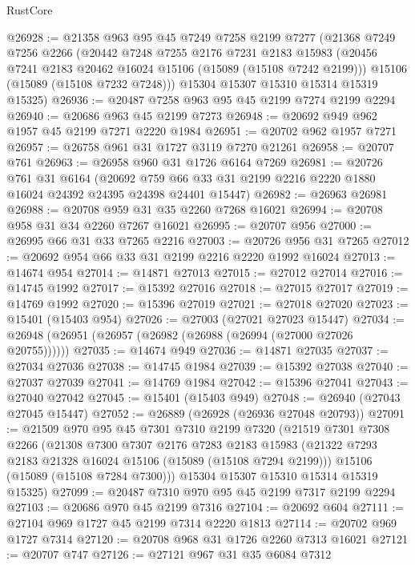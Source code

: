 \begin{lexlean}{RustCore}
\begin{coremodule}
@26928 := @21358
    @963
    @95
    @45
    @7249
    @7258
    @2199
    @7277
    (@21368
      @7249
      @7256
      @2266
      (@20442
        @7248
        @7255
        @2176
        @7231
        @2183
        @15983
        (@20456 @7241 @2183 @20462 @16024 @15106 (@15089 (@15108 @7242 @2199)))
        @15106
        (@15089 (@15108 @7232 @7248)))
      @15304
      @15307
      @15310
      @15314
      @15319
      @15325)
@26936 := @20487 @7258 @963 @95 @45 @2199 @7274 @2199 @2294
@26940 := @20686 @963 @45 @2199 @7273
@26948 := @20692 @949 @962 @1957 @45 @2199 @7271 @2220 @1984
@26951 := @20702 @962 @1957 @7271
@26957 := @26758 @961 @31 @1727 @3119 @7270 @21261
@26958 := @20707 @761
@26963 := @26958 @960 @31 @1726 @6164 @7269
@26981 := @20726
    @761
    @31
    @6164
    (@20692 @759 @66 @33 @31 @2199 @2216 @2220 @1880 @16024 @24392 @24395 @24398 @24401 @15447)
@26982 := @26963 @26981
@26988 := @20708 @959 @31 @35 @2260 @7268 @16021
@26994 := @20708 @958 @31 @34 @2260 @7267 @16021
@26995 := @20707 @956
@27000 := @26995 @66 @31 @33 @7265 @2216
@27003 := @20726 @956 @31 @7265
@27012 := @20692 @954 @66 @33 @31 @2199 @2216 @2220 @1992 @16024
@27013 := @14674 @954
@27014 := @14871 @27013
@27015 := @27012 @27014
@27016 := @14745 @1992
@27017 := @15392 @27016
@27018 := @27015 @27017
@27019 := @14769 @1992
@27020 := @15396 @27019
@27021 := @27018 @27020
@27023 := @15401 (@15403 @954)
@27026 := @27003 (@27021 @27023 @15447)
@27034 := @26948 (@26951 (@26957 (@26982 (@26988 (@26994 (@27000 @27026 @20755))))))
@27035 := @14674 @949
@27036 := @14871 @27035
@27037 := @27034 @27036
@27038 := @14745 @1984
@27039 := @15392 @27038
@27040 := @27037 @27039
@27041 := @14769 @1984
@27042 := @15396 @27041
@27043 := @27040 @27042
@27045 := @15401 (@15403 @949)
@27048 := @26940 (@27043 @27045 @15447)
@27052 := @26889 (@26928 (@26936 @27048 @20793))
@27091 := @21509
    @970
    @95
    @45
    @7301
    @7310
    @2199
    @7320
    (@21519
      @7301
      @7308
      @2266
      (@21308
        @7300
        @7307
        @2176
        @7283
        @2183
        @15983
        (@21322 @7293 @2183 @21328 @16024 @15106 (@15089 (@15108 @7294 @2199)))
        @15106
        (@15089 (@15108 @7284 @7300)))
      @15304
      @15307
      @15310
      @15314
      @15319
      @15325)
@27099 := @20487 @7310 @970 @95 @45 @2199 @7317 @2199 @2294
@27103 := @20686 @970 @45 @2199 @7316
@27104 := @20692 @604
@27111 := @27104 @969 @1727 @45 @2199 @7314 @2220 @1813
@27114 := @20702 @969 @1727 @7314
@27120 := @20708 @968 @31 @1726 @2260 @7313 @16021
@27121 := @20707 @747
@27126 := @27121 @967 @31 @35 @6084 @7312

\end{coremodule}
\end{lexlean}

